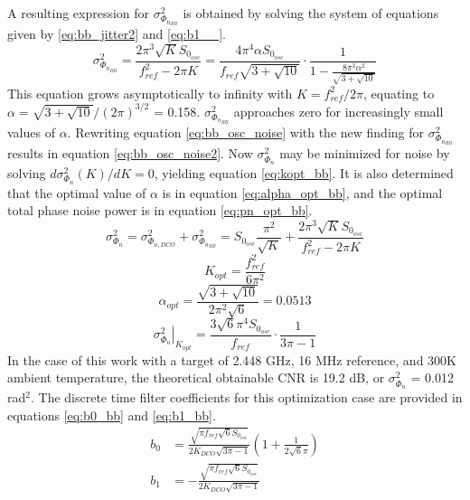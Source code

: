 	A resulting expression for $\sigma^2_{\Phi_{n_{BB}}}$ is obtained by solving the system of equations given by \ref{eq:bb_jitter2} and \ref{eq:b1__}.
	 	\begin{equation}
	 		\sigma^2_{\Phi_{n_{BB}}} = \frac{2\pi^3\sqrt{K}S_{0_{osc}}}{f_{ref}^2  - 2\pi K} = \frac{4\pi^4\alpha S_{0_{osc}}}{f_{ref}\sqrt{3+\sqrt{10}}}\cdot \frac{1}{1-\frac{8\pi^3\alpha^2}{\sqrt{3+\sqrt{10}}}}
	 	\end{equation}
	This equation grows asymptotically to infinity with $K=f_{ref}^2/2\pi$, equating to $\alpha = \sqrt{3+\sqrt{10}}/(2\pi)^{3/2}$  = 0.158. $\sigma^2_{\Phi_{n_{BB}}}$ approaches zero for increasingly small values of $\alpha$. Rewriting equation \ref{eq:bb_osc_noise} with the new finding for $\sigma^2_{\Phi_{n_{BB}}}$ results in equation \ref{eq:bb_osc_noise2}. Now $\sigma_{\Phi_{n}}^2$ may be minimized for noise by solving $d\sigma_{\Phi_{n}}^2(K)/dK =0$, yielding equation \ref{eq:kopt_bb}. It is also determined that the optimal value of $\alpha$ is in equation \ref{eq:alpha_opt_bb}, and the optimal total phase noise power is in equation \ref{eq:pn_opt_bb}.
	\begin{equation}\label{eq:bb_osc_noise2}
		\sigma_{\Phi_{n}}^2 = \sigma_{\Phi_{n,DCO}}^2 + \sigma^2_{\Phi_{n_{BB}}} = S_{0_{osc}}\frac{\pi^2}{\sqrt{K}} + \frac{2\pi^3\sqrt{K}S_{0_{osc}}}{f_{ref}^2  - 2\pi K}
	\end{equation}
	\begin{equation} \label{eq:kopt_bb}
		K_{opt} = \frac{f_{ref}^2}{6\pi^2}
	\end{equation}
	\begin{equation} \label{eq:alpha_opt_bb}
		\alpha_{opt} = \frac{\sqrt{3+\sqrt{10}}}{2\pi^2\sqrt{6}} = 0.0513
	\end{equation}
	\begin{equation} \label{eq:pn_opt_bb}
		\left.\sigma_{\Phi_{n}}^2 \right|_{K_{opt}} = \frac{3\sqrt{6}\pi^4S_{0_{osc}}}{f_{ref}}\cdot\frac{1}{3\pi - 1}
	\end{equation}
	In the case of this work with a target of 2.448 GHz, 16 MHz reference, and 300K ambient temperature, the theoretical obtainable CNR is 19.2 dB, or $\sigma_{\Phi_{n}}^2$ = 0.012 rad$^2$. The discrete time filter coefficients for this optimization case are provided in equations \ref{eq:b0_bb} and \ref{eq:b1_bb}.
	\begin{align}
		b_0 &= \frac{\sqrt{\pi f_{ref}\sqrt{6}S_{0_{osc}}}}{2K_{DCO}\sqrt{3\pi-1}}\left( 1 + \frac{1}{2\sqrt{6}\pi} \right) \label{eq:b0_bb}\\
		b_1 &= -\frac{\sqrt{\pi f_{ref}\sqrt{6}S_{0_{osc}}}}{2K_{DCO}\sqrt{3\pi-1}}\label{eq:b1_bb}
	\end{align}


